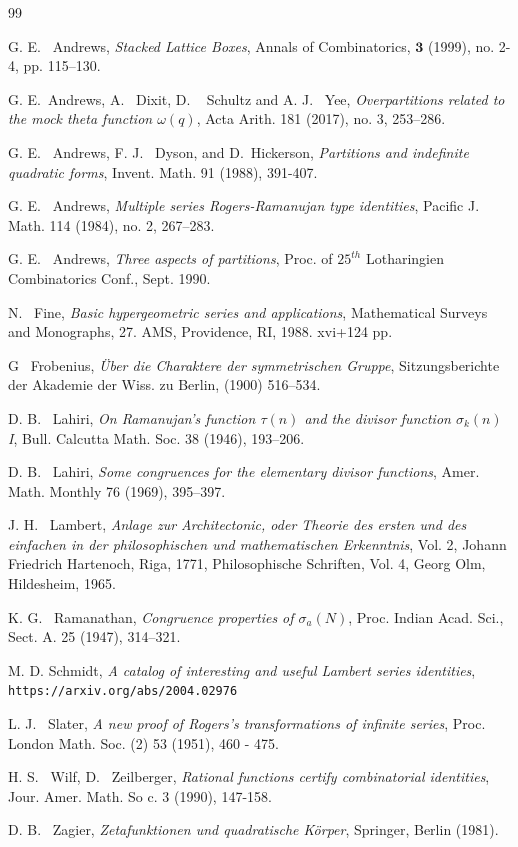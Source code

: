 \documentclass[a4paper,reqno,12pt]{amsart}
\begin{document}
\begin{thebibliography}{99}

 G. E. ~Andrews,
\emph{Stacked Lattice Boxes}, Annals of Combinatorics, $\mathbf{3}$ (1999), no. 2-4, pp. 115–130.

 G. E.~Andrews, A.~ Dixit, D. ~ Schultz and A. J. ~Yee,
\emph{Overpartitions related to the mock theta function $\omega(q)$},
Acta Arith. 181 (2017), no. 3, 253–286.

 G. E. ~Andrews, F. J. ~Dyson, and D.~Hickerson, 
\emph{Partitions and indefinite quadratic forms}, 
Invent. Math. 91 (1988), 391-407.

 G. E. ~Andrews,
\emph{Multiple series Rogers-Ramanujan type identities},
Pacific J. Math. 114 (1984), no. 2, 267–283.

 G. E. ~Andrews,
\emph{Three aspects of partitions}, Proc. of $25^{th}$ Lotharingien Combinatorics Conf., Sept. 1990.

 N. ~Fine, \emph{Basic hypergeometric series and applications}, Mathematical Surveys and Monographs, 27. AMS, Providence, RI, 1988. xvi+124 pp.

 G ~Frobenius,
\emph{ \"Uber die Charaktere der symmetrischen Gruppe}, 
Sitzungsberichte der Akademie der Wiss. zu Berlin, (1900) 516–534.

 D. B. ~Lahiri, 
\emph{On Ramanujan's function $\tau(n)$ and the divisor function $\sigma_k(n)$ I},
Bull. Calcutta Math. Soc. 38 (1946), 193–206.

 D. B. ~Lahiri,
\emph{Some congruences for the elementary divisor functions},
Amer. Math. Monthly 76 (1969), 395–397.

 J. H. ~Lambert,
\emph{Anlage zur Architectonic, oder Theorie des ersten und des einfachen in der philosophischen und mathematischen Erkenntnis}, Vol. 2, Johann Friedrich Hartenoch, Riga, 1771, Philosophische Schriften, Vol. 4, Georg Olm, Hildesheim, 1965.



 K. G. ~Ramanathan, 
\emph{Congruence properties of $\sigma_a(N)$},
Proc. Indian Acad. Sci., Sect. A. 25 (1947), 314–321.

 M. D. Schmidt,
\emph{A catalog of interesting and useful Lambert series identities},
{\tt https://arxiv.org/abs/2004.02976}

 L. J. ~Slater, 
\emph{A new proof of Rogers's transformations of infinite series},
Proc. London Math. Soc. (2) 53 (1951), 460 - 475.

 H. S. ~Wilf, D. ~Zeilberger, 
\emph{Rational functions certify combinatorial identities}, 
Jour. Amer. Math. So c. 3 (1990), 147-158.

 D. B. ~Zagier, 
\emph{Zetafunktionen und quadratische K\"orper}, 
Springer, Berlin (1981).


\end{thebibliography}
\end{document}
